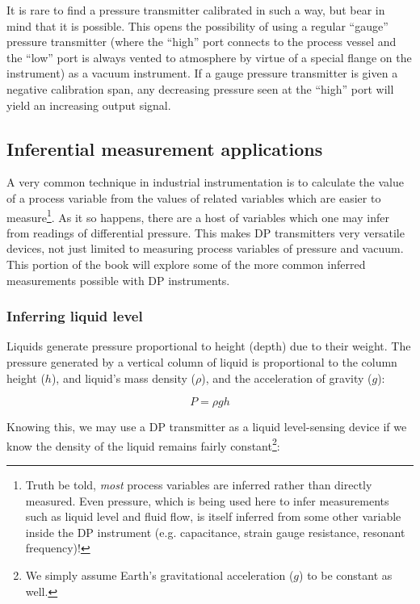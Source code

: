 It is rare to find a pressure transmitter calibrated in such a way, but bear in mind that it is possible.  This opens the possibility of using a regular ``gauge'' pressure transmitter (where the ``high'' port connects to the process vessel and the ``low'' port is always vented to atmosphere by virtue of a special flange on the instrument) as a vacuum instrument.  If a gauge pressure transmitter is given a negative calibration span, any decreasing pressure seen at the ``high'' port will yield an increasing output signal.





\filbreak
\subsection{Inferential measurement applications}

A very common technique in industrial instrumentation is to calculate the value of a process variable from the values of related variables which are easier to measure\footnote{Truth be told, \textit{most} process variables are inferred rather than directly measured.  Even pressure, which is being used here to infer measurements such as liquid level and fluid flow, is itself inferred from some other variable inside the DP instrument (e.g. capacitance, strain gauge resistance, resonant frequency)!}.  As it so happens, there are a host of variables which one may infer from readings of differential pressure.  This makes DP transmitters very versatile devices, not just limited to measuring process variables of pressure and vacuum.  This portion of the book will explore some of the more common inferred measurements possible with DP instruments.






\filbreak
\subsubsection{Inferring liquid level}

Liquids generate pressure proportional to height (depth) due to their weight.  The pressure generated by a vertical column of liquid is proportional to the column height ($h$), and liquid's mass density ($\rho$), and the acceleration of gravity ($g$):

$$P = \rho g h$$

Knowing this, we may use a DP transmitter as a liquid level-sensing device if we know the density of the liquid remains fairly constant\footnote{We simply assume Earth's gravitational acceleration ($g$) to be constant as well.}:

